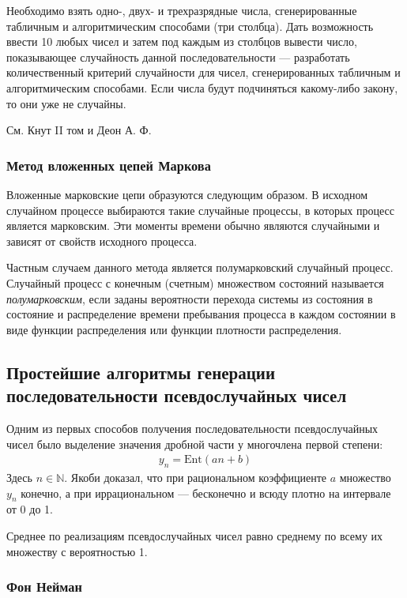 Необходимо взять одно-, двух- и трехразрядные числа, сгенерированные табличным и алгоритмическим способами (три столбца). Дать возможность ввести 10 любых чисел и затем под каждым из столбцов вывести число, показывающее случайность данной последовательности --- разработать количественный критерий случайности для чисел, сгенерированных табличным и алгоритмическим способами. Если числа будут подчиняться какому-либо закону, то они уже не случайны.

См. Кнут II том и Деон А. Ф.

\subsubsection{Метод вложенных цепей Маркова}

Вложенные марковские цепи образуются следующим образом. В исходном случайном процессе выбираются такие случайные процессы, в которых процесс является марковским. Эти моменты времени обычно являются случайными и зависят от свойств исходного процесса.

Частным случаем данного метода является полумарковский случайный процесс. Случайный процесс с конечным (счетным) множеством состояний называется \textit{полумарковским}, если заданы вероятности перехода системы из состояния в состояние и распределение времени пребывания процесса в каждом состоянии в виде функции распределения или функции плотности распределения.

\subsection{Простейшие алгоритмы генерации последовательности псевдослучайных чисел}

Одним из первых способов получения последовательности псевдослучайных чисел было выделение значения дробной части у многочлена первой степени:
%
\begin{gather*}
    y_n = \text{Ent}(an+b)
\end{gather*}
%
Здесь $n\in\mathbb{N}$. Якоби доказал, что при рациональном коэффициенте $a$ множество $y_n$ конечно, а при иррациональном --- бесконечно и всюду плотно на интервале от 0 до 1.

Среднее по реализациям псевдослучайных чисел равно среднему по всему их множеству с вероятностью 1.

\subsubsection{Фон Нейман}


